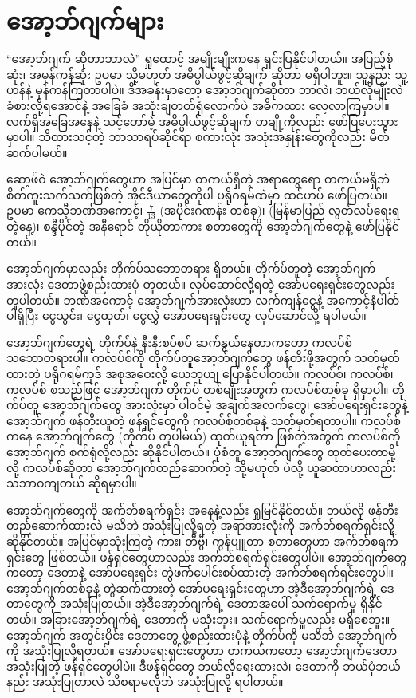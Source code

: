 \chapter{အော့ဘ်ဂျက်များ}

“အော့ဘ်ဂျက်  ဆိုတာဘာလဲ” ရှုထောင့် အမျိုးမျိုးကနေ ရှင်းပြနိုင်ပါတယ်။ အပြည့်စုံဆုံး၊ အမှန်ကန်ဆုံး ဥပမာ သို့မဟုတ် အဓိပ္ပါယ်ဖွင့်ဆိုချက် ဆိုတာ မရှိပါဘူး။ သူ့နည်း သူ့ဟန်နဲ့ မှန်ကန်ကြတာပါပဲ။ ဒီအခန်းမှာတော့ အော့ဘ်ဂျက်ဆိုတာ ဘာလဲ၊ ဘယ်လိုမျိုးလဲ ခံစားလို့ရအောင်နဲ့ အခြေခံ အသုံးချတတ်ရုံလောက်ပဲ အဓိကထား လေ့လာကြမှာပါ။  လက်ရှိအခြေအနေနဲ့ သင့်တော်မဲ့ အဓိပ္ပါယ်ဖွင့်ဆိုချက် တချို့ကိုလည်း ဖော်ပြပေးသွားမှာပါ။ သိထားသင့်တဲ့ ဘာသာရပ်ဆိုင်ရာ စကားလုံး အသုံးအနှုန်းတွေကိုလည်း မိတ်ဆက်ပါမယ်။

ဆော့ဖ်ဝဲ  အော့ဘ်ဂျက်တွေဟာ အပြင်မှာ တကယ်ရှိတဲ့ အရာတွေရော တကယ်မရှိဘဲ  စိတ်ကူးသက်\allowbreak သက်ဖြစ်တဲ့ အိုင်ဒီယာတွေကိုပါ  ပရိုဂရမ်ထဲမှာ ထင်ဟပ် ဖော်ပြတယ်။ ဥပမာ ကေသီ့ဘဏ်အကောင့်၊ $\frac{7}{13}$ (အပိုင်းဂဏန်း တစ်ခု)၊  (မြန်မာပြည် လွတ်လပ်ရေးရတဲ့နေ့)၊ စန္ဒီပိုင်တဲ့ အနီရောင် တိုယိုတာကား စတာတွေကို အော့ဘ်ဂျက်တွေနဲ့ ဖော်ပြနိုင်တယ်။


အော့ဘ်ဂျက်မှာလည်း တိုက်ပ်သဘောတရား ရှိတယ်။ တိုက်ပ်တူတဲ့ အော့ဘ်ဂျက်အားလုံး ဒေတာဖွဲ့စည်းထားပုံ တူတယ်။ လုပ်ဆောင်လို့ရတဲ့ အော်ပရေးရှင်းတွေလည်း တူပါတယ်။ ဘဏ်အကောင့် အော့ဘ်ဂျက်အားလုံးဟာ လက်ကျန်ငွေနဲ့ အကောင့်နံပါတ် ပါရှိပြီး ငွေသွင်း၊ ငွေထုတ်၊ ငွေလွှဲ အော်ပရေးရှင်းတွေ လုပ်ဆောင်လို့ ရပါမယ်။ 

အော့ဘ်ဂျက်တွေရဲ့ တိုက်ပ်နဲ့ နီးနီးစပ်စပ် ဆက်နွယ်နေတာကတော့ ကလပ်စ်  သဘောတရားပါ။ ကလပ်စ်ကို တိုက်ပ်တူအော့ဘ်ဂျက်တွေ ဖန်တီးဖို့အတွက် သတ်မှတ်ထားတဲ့ ပရိုဂရမ်ကုဒ် အစုအဝေးလို့ ယေဘုယျ ပြောနိုင်ပါတယ်။  ကလပ်စ်၊  ကလပ်စ်၊  ကလပ်စ် စသည်ဖြင့် အော့ဘ်ဂျက် တိုက်ပ် တစ်မျိုးအတွက် ကလပ်စ်တစ်ခု ရှိမှာပါ။ တိုက်ပ်တူ အော့ဘ်ဂျက်တွေ အားလုံးမှာ ပါဝင်မဲ့ အချက်အလက်တွေ၊ အော်ပရေးရှင်းတွေနဲ့ အော့ဘ်ဂျက် ဖန်တီးယူတဲ့ ဖန်ရှင်တွေကို ကလပ်စ်တစ်ခုနဲ့ သတ်မှတ်ရတာပါ။ ကလပ်စ်ကနေ  အော့ဘ်ဂျက်တွေ (တိုက်ပ် တူပါမယ်) ထုတ်ယူရတာ ဖြစ်တဲ့အတွက် ကလပ်စ်ကို အော့ဘ်ဂျက် စက်ရုံလို့လည်း ဆိုနိုင်ပါတယ်။ ပုံစံတူ အော့ဘ်ဂျက်တွေ ထုတ်ပေးတာမို့လို့ ကလပ်စ်ဆိုတာ အော့ဘ်ဂျက်တည်ဆောက်တဲ့  သို့မဟုတ်  ပဲလို့ ယူဆတာဟာလည်း သဘာဝကျတယ် ဆိုရမှာပါ။ 

အော့ဘ်ဂျက်တွေကို အက်ဘ်စရက်ရှင်း  အနေနဲ့လည်း ရှုမြင်နိုင်တယ်။ ဘယ်လို ဖန်တီး တည်ဆောက်ထားလဲ မသိဘဲ အသုံးပြုလို့ရတဲ့ အရာအားလုံးကို အက်ဘ်စရက်ရှင်းလို့ ဆိုနိုင်တယ်။ အပြင်မှာသုံးကြတဲ့ ကား၊ တီဗွီ၊ ကွန်ပျူတာ စတာတွေဟာ အက်ဘ်စရက်ရှင်းတွေ ဖြစ်တယ်။ ဖန်ရှင်တွေဟာလည်း အက်ဘ်စရက်ရှင်းတွေပါပဲ။ အော့ဘ်ဂျက်တွေကတော့ ဒေတာနဲ့ အော်ပရေးရှင်း တွဲဖက်ပေါင်းစပ်ထားတဲ့ အက်ဘ်စရက်ရှင်းတွေပါ။ အော့ဘ်ဂျက်တစ်ခုနဲ့ တွဲဆက်ထားတဲ့ အော်ပရေးရှင်းတွေဟာ အဲ့ဒီအော့ဘ်ဂျက်ရဲ့ ဒေတာတွေကို အသုံးပြုတယ်။ အဲ့ဒီအော့ဘ်ဂျက်ရဲ့ ဒေတာအပေါ် သက်ရောက်မှု ရှိနိုင်တယ်။ အခြားအော့ဘ်ဂျက်ရဲ့ ဒေတာကို မသုံးဘူး။ သက်ရောက်မှူလည်း မရှိစေဘူး။ အော့ဘ်ဂျက် အတွင်းပိုင်း ဒေတာတွေ ဖွဲ့စည်းထားပုံနဲ့ တိုက်ပ်ကို  မသိဘဲ အော့ဘ်ဂျက်ကို အသုံးပြုလို့ရတယ်။ အော်ပရေးရှင်းတွေဟာ တကယ်ကတော့ အော့ဘ်ဂျက်ဒေတာ အသုံးပြုတဲ့ ဖန်ရှင်တွေပါပဲ။ ဒီဖန်ရှင်တွေ ဘယ်လိုရေးထားလဲ၊ ဒေတာကို ဘယ်ပုံဘယ်နည်း အသုံးပြုတာလဲ သိစရာမလိုဘဲ အသုံးပြုလို့ ရပါတယ်။ 

